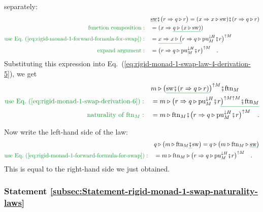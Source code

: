 separately:
\begin{align}
 & \gunderline{\text{sw}}\bef\big(r\Rightarrow q\triangleright r\big)=(x\Rightarrow x\triangleright\text{sw})\bef(r\Rightarrow q\triangleright r)\nonumber \\
{\color{greenunder}\text{function composition}:}\quad & =(x\Rightarrow\gunderline{q\triangleright(x\triangleright\text{sw})})\nonumber \\
{\color{greenunder}\text{use Eq.~(\ref{eq:rigid-monad-1-forward-formula-for-swap})}:}\quad & =\gunderline{x\Rightarrow x\triangleright\big(}r\Rightarrow q\triangleright\text{pu}_{M}^{\downarrow H}\bef r\big)^{\uparrow M}\nonumber \\
{\color{greenunder}\text{expand argument}:}\quad & =\big(r\Rightarrow q\triangleright\text{pu}_{M}^{\downarrow H}\bef r\big)^{\uparrow M}\quad.\label{eq:rigid-monad-1-swap-derivation-6}
\end{align}
Substituting this expression into Eq.~(\ref{eq:rigid-monad-1-swap-law-4-derivation-5}),
we get
\begin{align*}
 & m\triangleright\big(\gunderline{\text{sw}\bef(r\Rightarrow q\triangleright r)}\big)^{\uparrow M}\bef\text{ftn}_{M}\\
{\color{greenunder}\text{use Eq.~(\ref{eq:rigid-monad-1-swap-derivation-6})}:}\quad & =m\triangleright\big(r\Rightarrow q\triangleright\text{pu}_{M}^{\downarrow H}\bef r\gunderline{\big)^{\uparrow M\uparrow M}\bef\text{ftn}_{M}}\\
{\color{greenunder}\text{naturality of }\text{ftn}_{M}:}\quad & =m\triangleright\text{ftn}_{M}\bef\big(r\Rightarrow q\triangleright\text{pu}_{M}^{\downarrow H}\bef r\big)^{\uparrow M}\quad.
\end{align*}

Now write the left-hand side of the law:
\begin{align*}
 & q\triangleright\big(m\triangleright\text{ftn}_{M}\gunderline{\bef}\text{sw}\big)=q\triangleright\big(m\triangleright\text{ftn}_{M}\triangleright\gunderline{\text{sw}}\big)\\
{\color{greenunder}\text{use Eq.~(\ref{eq:rigid-monad-1-forward-formula-for-swap})}:}\quad & =m\triangleright\text{ftn}_{M}\triangleright\big(r\Rightarrow q\triangleright\text{pu}_{M}^{\downarrow H}\bef r\big)^{\uparrow M}\quad.
\end{align*}
This is equal to the right-hand side we just obtained.

\subsubsection{Statement \label{subsec:Statement-rigid-monad-1-swap-naturality-laws}\ref{subsec:Statement-rigid-monad-1-swap-naturality-laws}}

